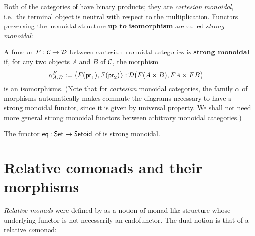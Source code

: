 \documentclass{amsart}
\newcommand{\fat}[1]{\textbf{#1}}
\begin{document}
Both of the categories of  have binary products; they are \emph{cartesian monoidal}, i.e.\ the terminal 
object is neutral with respect to the multiplication. Functors preserving the monoidal structure \textbf{up to isomorphism}
are called \emph{strong monoidal}:

\begin{definition}\label{def:monoidal_functor}
 A functor $F:{\mathcal{C}}\to\mathcal{D}$ between cartesian monoidal categories is \fat{strong monoidal} if, for any two objects $A$ and $B$ of ${\mathcal{C}}$,
  the morphism
 \[ \alpha^F_{A,B} := \bigl\langle F(\mathsf{pr}_1), F(\mathsf{pr}_2) \bigr\rangle : \mathcal{D}\bigl(F(A\times B), FA\times FB\bigr)\enspace  \] 
 is an isomorphisms.
 (Note that for \emph{cartesian} monoidal categories, the family $\alpha$ of morphisms automatically makes commute the 
  diagrams necessary to have a strong monoidal functor, since it is given by universal property. 
  We shall not need more general strong monoidal functors between arbitrary monoidal categories.)
\end{definition}

\begin{example}
  The functor $\mathsf{eq}: \mathsf{Set} \to \mathsf{Setoid}$ of  is strong monoidal.
\end{example}


\section{Relative comonads and their morphisms}\label{sec:comonads}

\emph{Relative monads} were defined by \textcite{DBLP:conf/fossacs/AltenkirchCU10} as a notion of monad-like structure
whose underlying functor is not necessarily an endofunctor.
The dual notion is that of a relative \emph{co}monad:
\end{document}
